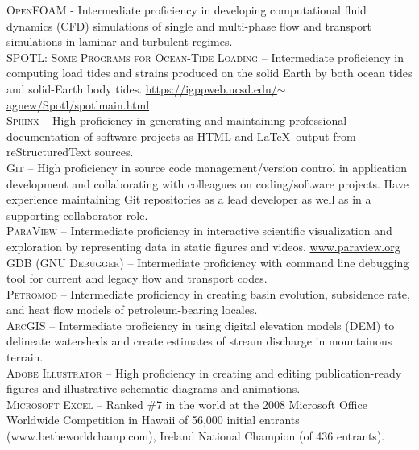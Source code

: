 \documentclass[11pt, letterpaper]{article}
\begin{document}
\textsc{OpenFOAM} - Intermediate proficiency in developing computational fluid
dynamics (CFD) simulations of single and multi-phase flow and transport
simulations in laminar and turbulent regimes. \\ [5pt]
\textsc{SPOTL: Some Programs for Ocean-Tide Loading} – Intermediate proficiency in
computing load tides and strains produced on the solid Earth by both ocean
tides and solid-Earth body tides.
\href{https://igppweb.ucsd.edu/~agnew/Spotl/spotlmain.html}{https://igppweb.ucsd.edu/\(\sim \)agnew/Spotl/spotlmain.html}\\[5pt]
\textsc{Sphinx} – High proficiency in generating and maintaining professional
documentation of software projects as HTML and \LaTeX \ output from
reStructuredText sources.\\[5pt]
\textsc{Git} – High proficiency in source code management/version control
in application development and collaborating with colleagues on coding/software
projects. Have experience maintaining Git repositories as a lead developer as
well as in a supporting collaborator role.\\[5pt]
\textsc{ParaView} – Intermediate proficiency in interactive scientific
visualization and exploration by representing data in static figures and
videos. \href{https://www.paraview.org/}{www.paraview.org} \\[5pt]
\textsc{GDB (GNU Debugger)} – Intermediate proficiency with command line debugging
tool for current and legacy flow and transport codes.\\[5pt] 
\textsc{Petromod} – Intermediate proficiency in creating basin evolution,
subsidence rate, and heat flow models of petroleum-bearing
locales.\\[5pt] 
\textsc{ArcGIS} – Intermediate proficiency in using digital elevation models (DEM)
to delineate watersheds and create estimates of stream discharge in mountainous
terrain.\\[5pt] 
\textsc{Adobe Illustrator} – High proficiency in creating and editing
publication-ready figures and illustrative schematic diagrams and animations.\\[5pt] 
\textsc{Microsoft Excel} – Ranked \#7 in the world at the 2008 Microsoft Office
Worldwide Competition in Hawaii of 56,000 initial entrants
(www.betheworldchamp.com), Ireland National Champion (of 436 entrants).
\end{document}
